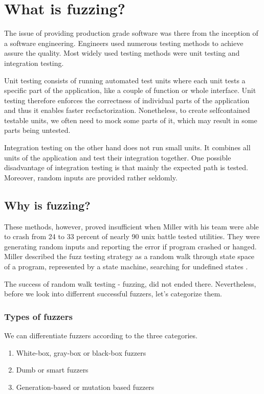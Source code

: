 \chapter{What is fuzzing?}
\label{cha:What is fuzzing?}
The issue of providing production grade software was there from the inception of a software engineering. Engineers used numerous testing methods to achieve assure the quality. Most widely used testing methods were unit testing and integration testing.

Unit testing consists of running automated test units where each unit tests a specific part of the application, like a couple of function or whole interface. Unit testing therefore enforces the correctness of individual parts of the application and thus it enables faster recfactorization. Nonetheless, to create selfcontained testable units, we often need to mock some parts of it, which may result in some parts being untested.

Integration testing on the other hand does not run small units. It combines all units of the application and test their integration together. One possible disadvantage of integration testing is that mainly the expected path is tested. Moreover, random inputs are provided rather seldomly.

\section{Why is fuzzing?}
These methods, however, proved insufficient when Miller with his team were able to crash from 24 to 33 percent of nearly 90 unix battle tested utilities. They were generating random inputs and reporting the error if program crashed or hanged. Miller described the fuzz testing strategy as a random walk through state space of a program, represented by a state machine, searching for undefined states \cite{miller1990empirical}.

The success of random walk testing - fuzzing, did not ended there. Nevertheless, before we look into differrent successful fuzzers, let's categorize them.


\subsection{Types of fuzzers}
\label{sub:Types of fuzzers}
We can differentiate fuzzers according to the three categories.
\begin{enumerate}
    \item White-box, gray-box or black-box fuzzers
    \item Dumb or smart fuzzers
    \item Generation-based or mutation based fuzzers
\end{enumerate}

